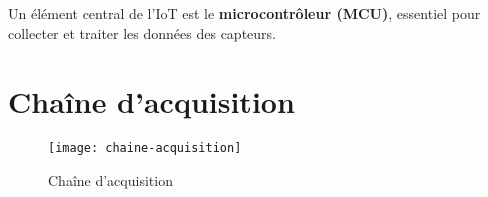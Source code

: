 Un élément central de l'IoT est le \textbf{microcontrôleur (MCU)}, essentiel pour collecter et traiter les données des capteurs.

\section{Chaîne d'acquisition}

\begin{figure}[!ht]
  \centering
  \texttt{[image: chaine-acquisition]}
  \caption{Chaîne d'acquisition}
  \label{figChainAcquisition}
\end{figure}